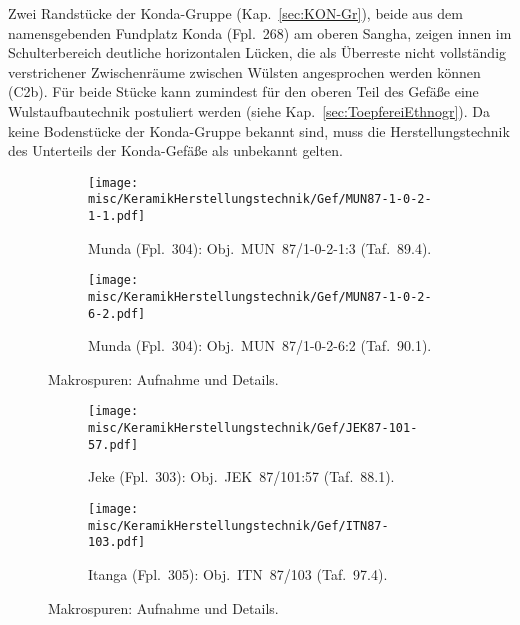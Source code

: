 Zwei Randstücke der Konda-Gruppe (Kap.~\ref{sec:KON-Gr}), beide aus dem namensgebenden Fundplatz Konda (Fpl.~268) am oberen Sangha, zeigen innen im Schulterbereich deutliche horizontalen Lücken, die als Überreste nicht vollständig verstrichener Zwischenräume zwischen Wülsten angesprochen werden können (C2b). Für beide Stücke kann zumindest für den oberen Teil des Gefäße eine Wulstaufbautechnik postuliert werden (siehe Kap.~\ref{sec:ToepfereiEthnogr}). Da keine Bodenstücke der Konda-Gruppe bekannt sind, muss die Herstellungstechnik des Unterteils der Konda-Gefäße als unbekannt gelten.

\begin{figure*}[p]
	\centering
	\begin{subfigure}{\textwidth}
		\centering
		\texttt{[image: misc/KeramikHerstellungstechnik/Gef/MUN87-1-0-2-1-1.pdf]}
		\caption{Munda (Fpl.~304): Obj.~MUN~87/1-0-2-1:3 (Taf.~89.4).\vspace{1em}}
		\label{MUN87-1-0-2-1-3_Makrospuren}
	\end{subfigure}
	\begin{subfigure}{\textwidth}
		\centering
		\texttt{[image: misc/KeramikHerstellungstechnik/Gef/MUN87-1-0-2-6-2.pdf]}
		\caption{Munda (Fpl.~304): Obj.~MUN~87/1-0-2-6:2 (Taf.~90.1).}
		\label{MUN87-1-0-2-6-2_Makrospuren}
	\end{subfigure}
	\caption{Makrospuren: Aufnahme und Details.}
\end{figure*}

\begin{figure*}[p]
	\centering
	\begin{subfigure}{\textwidth}
		\centering
		\texttt{[image: misc/KeramikHerstellungstechnik/Gef/JEK87-101-57.pdf]}
		\caption{Jeke (Fpl.~303): Obj.~JEK~87/101:57 (Taf.~88.1).\vspace{1em}}
		\label{JEK87-103-57_Makrospuren}
	\end{subfigure}
	\begin{subfigure}{\textwidth}
		\centering
		\texttt{[image: misc/KeramikHerstellungstechnik/Gef/ITN87-103.pdf]}
		\caption{Itanga (Fpl.~305): Obj.~ITN~87/103 (Taf.~97.4).}
		\label{ITN87-103_Makrospuren}
	\end{subfigure}
	\caption{Makrospuren: Aufnahme und Details.}
\end{figure*}

